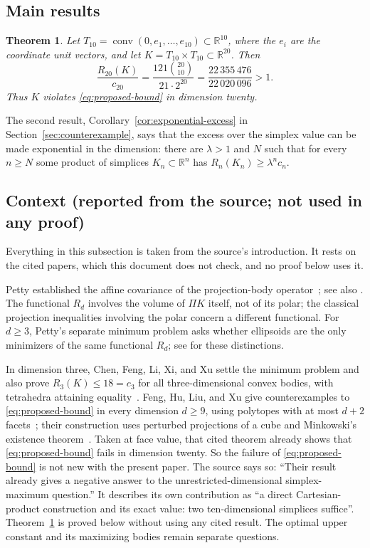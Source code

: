 \documentclass[11pt]{article}
\newtheorem{theorem}{Theorem}
\newcommand{\R}{\mathbb R}
\DeclareMathOperator{\conv}{conv}
\begin{document}
\subsection{Main results}

\begin{theorem}\label{thm:counterexample}
Let \(T_{10}=\conv(0,e_1,\ldots,e_{10})\subset\R^{10}\), where the
\(e_i\) are the coordinate unit vectors, and let
\(K=T_{10}\times T_{10}\subset\R^{20}\). Then
\[
 \frac{R_{20}(K)}{c_{20}}
 =\frac{121\binom{20}{10}}{21\cdot2^{20}}
 =\frac{22\,355\,476}{22\,020\,096}>1.
\]
Thus \(K\) violates \eqref{eq:proposed-bound} in dimension twenty.
\end{theorem}

The second result, Corollary~\ref{cor:exponential-excess} in
Section~\ref{sec:counterexample}, says that the excess over the simplex
value can be made exponential in the dimension: there are \(\lambda>1\) and
\(N\) such that for every \(n\ge N\) some product of simplices
\(K_n\subset\R^n\) has \(R_n(K_n)\ge\lambda^n c_n\).

\subsection{Context (reported from the source; not used in any proof)}

Everything in this subsection is taken from the source's introduction. It
rests on the cited papers, which this document does not check, and no
proof below uses it.

Petty established the affine covariance of the projection-body
operator~\cite{Petty}; see also \cite[Equation~(1)]{Ludwig}. The functional
\(R_d\) involves the volume of \(\Pi K\) itself, not of its polar; the
classical projection inequalities involving the polar concern a different
functional. For \(d\ge3\), Petty's separate minimum problem asks whether
ellipsoids are the only minimizers of the same functional \(R_d\); see
\cite[Section~1]{Saroglou} for these distinctions.

In dimension three, Chen, Feng, Li, Xi, and Xu settle the minimum problem
and also prove \(R_3(K)\le18=c_3\) for all three-dimensional convex bodies,
with tetrahedra attaining equality~\cite[Theorems~1.1 and~1.2]{ChenEtAl}.
Feng, Hu, Liu, and Xu give counterexamples to \eqref{eq:proposed-bound} in
every dimension \(d\ge9\), using polytopes with at most \(d+2\)
facets~\cite[Theorem~1.3]{FengEtAl}; their construction uses perturbed
projections of a cube and Minkowski's existence
theorem~\cite[Section~4]{FengEtAl}. Taken at face value, that cited theorem
already shows that \eqref{eq:proposed-bound} fails in dimension twenty. So
the failure of \eqref{eq:proposed-bound} is not new with the present paper.
The source says so: ``Their result already gives a negative answer to the
unrestricted-dimensional simplex-maximum question.'' It describes its own
contribution as ``a direct Cartesian-product construction and its exact
value: two ten-dimensional simplices suffice''.
Theorem~\ref{thm:counterexample} is proved below without using any cited
result. The optimal upper constant and its maximizing bodies remain
separate questions.
\end{document}

